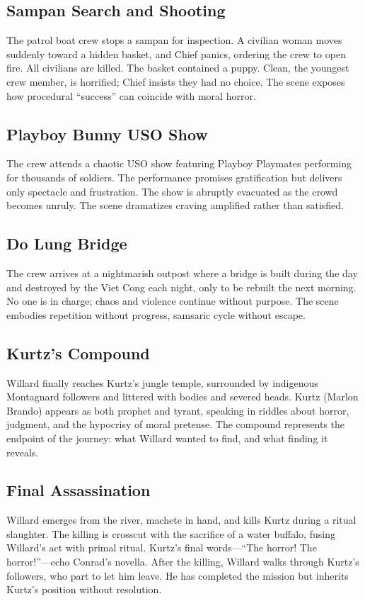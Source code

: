 \subsection*{Sampan Search and Shooting}
\label{scene:sampan}

The patrol boat crew stops a sampan for inspection. A civilian woman moves suddenly toward a
hidden basket, and Chief panics, ordering the crew to open fire. All civilians are killed. The
basket contained a puppy. Clean, the youngest crew member, is horrified; Chief insists they
had no choice. The scene exposes how procedural ``success'' can coincide with moral horror.

\subsection*{Playboy Bunny USO Show}
\label{scene:playboy-show}

The crew attends a chaotic USO show featuring Playboy Playmates performing for thousands of
soldiers. The performance promises gratification but delivers only spectacle and frustration.
The show is abruptly evacuated as the crowd becomes unruly. The scene dramatizes craving
amplified rather than satisfied.

\subsection*{Do Lung Bridge}
\label{scene:do-lung-bridge}

The crew arrives at a nightmarish outpost where a bridge is built during the day and destroyed
by the Viet Cong each night, only to be rebuilt the next morning. No one is in charge; chaos
and violence continue without purpose. The scene embodies repetition without progress, samsaric
cycle without escape.

\subsection*{Kurtz's Compound}
\label{scene:kurtz-compound}

Willard finally reaches Kurtz's jungle temple, surrounded by indigenous Montagnard followers
and littered with bodies and severed heads. Kurtz (Marlon Brando) appears as both prophet and
tyrant, speaking in riddles about horror, judgment, and the hypocrisy of moral pretense. The
compound represents the endpoint of the journey: what Willard wanted to find, and what finding
it reveals.

\subsection*{Final Assassination}
\label{scene:assassination}

Willard emerges from the river, machete in hand, and kills Kurtz during a ritual slaughter.
The killing is crosscut with the sacrifice of a water buffalo, fusing Willard's act with
primal ritual. Kurtz's final words---``The horror! The horror!''---echo Conrad's novella.
After the killing, Willard walks through Kurtz's followers, who part to let him leave. He has
completed the mission but inherits Kurtz's position without resolution.
